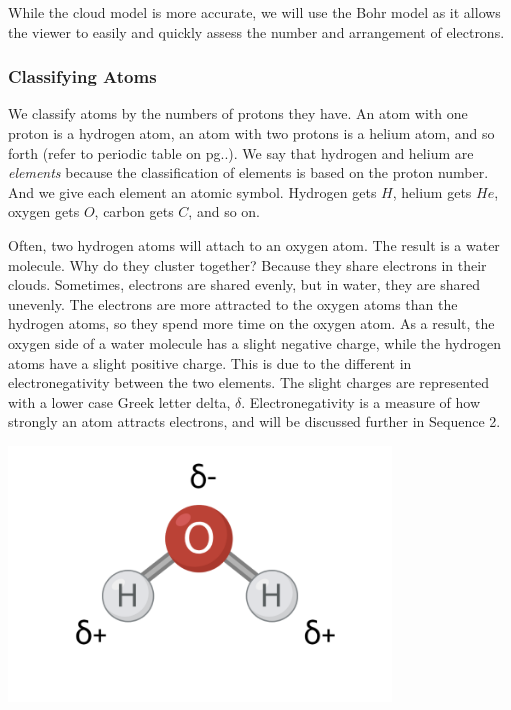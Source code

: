 While the cloud model is more accurate, we will use the Bohr model as it 
allows the viewer to easily and quickly assess the number and arrangement of 
electrons. 

\subsubsection{Classifying Atoms}

We classify atoms by the numbers of protons they have. An atom with one proton 
is a hydrogen atom, an atom with two protons is a helium atom, and so forth 
(refer to periodic table on pg..). We say that hydrogen and helium are \textit{
elements} because the classification of elements is based on the proton number. 
And we give each element an atomic symbol. Hydrogen gets $H$, helium gets $He$, 
oxygen gets $O$, carbon gets $C$, and so on.

Often, two hydrogen atoms will attach to an oxygen atom. The result is
a water molecule. Why do they cluster together? Because they 
share electrons in their clouds. Sometimes, electrons are shared evenly, but in 
water, they are shared unevenly. The electrons are more attracted to the oxygen 
atoms than the hydrogen atoms, so they spend more time on the oxygen atom. As a 
result, the oxygen side of a water molecule has a slight negative charge, while 
the hydrogen atoms have a slight positive charge. This is due to the different 
in electronegativity between the two elements. The 
slight charges are represented with a lower case Greek letter delta, $\delta$. 
Electronegativity is a measure of how strongly an atom attracts electrons, and 
will be discussed further in Sequence 2.

\begin{center}
\includegraphics[width=4in]{water_polar.png}
\end{center}

